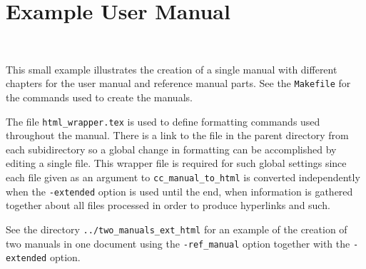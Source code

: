 
\chapter{Example User Manual}
\\

This small example illustrates the creation of a single manual with different
chapters for the user manual and reference manual parts.  See the 
\texttt{Makefile} for the commands used to create the manuals.

The file \texttt{html\_wrapper.tex} is used to define formatting commands
used throughout the manual.  There is a link to the file in the parent
directory from each subidirectory so a global change in formatting can
be accomplished by editing a single file.  This wrapper file is
required for such global settings since each file given as an argument to
\texttt{cc\_manual\_to\_html} is converted independently when the
\texttt{-extended} option is used until the end, when information is gathered 
together about all files processed in order to produce hyperlinks and such. 

See the directory \texttt{../two\_manuals\_ext\_html} for an
example of the creation of two manuals in one document using the
\texttt{-ref\_manual} option together with the \texttt{-extended}
option. 

